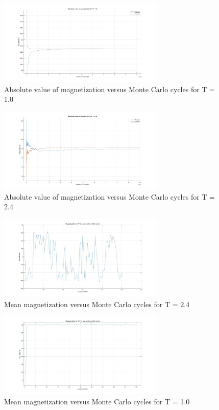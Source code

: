 \documentclass[10pt,a4paper]{article}
\begin{document}
\begin{figure}[H]
\centerline{
\includegraphics[width=0.7\textwidth]{absmag1T}
}
\caption{Absolute value of magnetization versus Monte Carlo cycles for T = 1.0}
\label{fig:absmag1T}
\end{figure}

\begin{figure}[H]
\centerline{
\includegraphics[width=0.7\textwidth]{absmag24T}
}
\caption{Absolute value of magnetization versus Monte Carlo cycles for T = 2.4}
\label{fig:absmag24T}
\end{figure}
\begin{figure}[H]
\centerline{
\includegraphics[width=0.7\textwidth]{magnetizationT24random}
}
\caption{Mean magnetization versus Monte Carlo cycles for T = 2.4}
\label{fig:mag24T}
\end{figure}
\begin{figure}[H]
\centerline{
\includegraphics[width=0.7\textwidth]{magnetizationT1random}
}
\caption{Mean magnetization versus Monte Carlo cycles for T = 1.0}
\label{fig:mag1T}
\end{figure}
\end{document}

